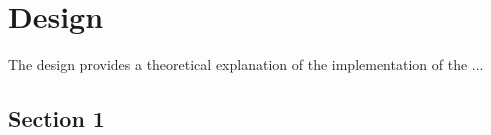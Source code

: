 

\chapter{Design}
\label{chap:design}

The design provides a theoretical explanation of the implementation of the ...

\minitoc
\newpage

\section{Section 1}

